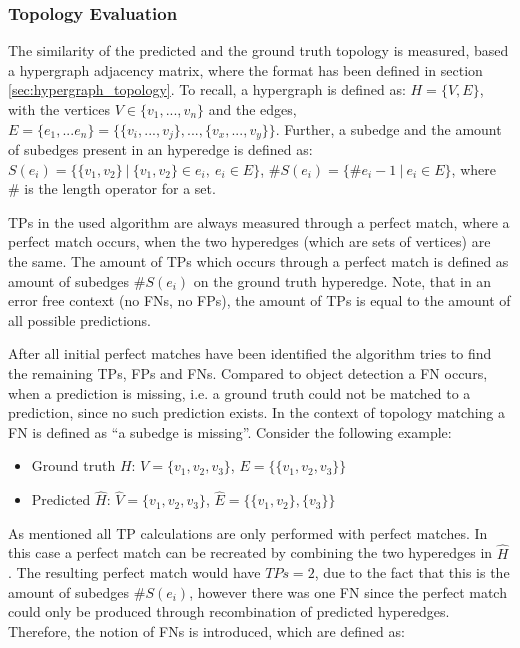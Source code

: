 \subsubsection{Topology Evaluation}

The similarity of the predicted and the ground truth topology is measured, based a hypergraph adjacency matrix, where the format has been defined in section \ref{sec:hypergraph_topology}.
To recall, a hypergraph is defined as: $H = \{V, E\}$, with the vertices $V \in \{v_1,...,v_n\}$ and the edges, $E = \{e_1,...e_n\} = \{\{v_i,...,v_j\},...,\{v_x,...,v_y\}\}$.
Further, a subedge and the amount of subedges present in an hyperedge is defined as: $S(e_i) = \{ \{v_1,v_2\}\ |\ \{v_1,v_2\} \in e_i,\ e_i \in E\}$, $\#S(e_i) = \{ \#e_i - 1\ |\  e_i \in E\}$, where \# is the length operator for a set.

\acp{TP} in the used algorithm are always measured through a perfect match, where a perfect match occurs, when the two hyperedges (which are sets of vertices) are the same.
The amount of \acp{TP} which occurs through a perfect match is defined as amount of subedges $\#S(e_i)$ on the ground truth hyperedge.
Note, that in an error free context (no \acp{FN}, no \acp{FP}), the amount of \acp{TP} is equal to the amount of all possible predictions.

After all initial perfect matches have been identified the algorithm tries to find the remaining \acp{TP}, \acp{FP} and \acp{FN}.
Compared to object detection a \ac{FN} occurs, when a prediction is missing, i.e. a ground truth could not be matched to a prediction, since no such prediction exists.
In the context of topology matching a \ac{FN} is defined as ``a subedge is missing''.
Consider the following example:

\begin{itemize}
    \item Ground truth $H$: $V = \{v_1, v_2, v_3\}$, $E = \{\{v_1, v_2, v_3\}\}$
    \item Predicted $\hat{H}$: $\hat{V} = \{v_1, v_2, v_3\}$, $\hat{E} = \{\{v_1, v_2\}, \{v_3\}\}$
\end{itemize}

As mentioned all \ac{TP} calculations are only performed with perfect matches.
In this case a perfect match can be recreated by combining the two hyperedges in $\hat{H}$.
The resulting perfect match would have $TPs = 2$, due to the fact that this is the amount of subedges $\#S(e_i)$, however there was one \ac{FN} since the perfect match could only be produced through recombination of predicted hyperedges.
Therefore, the notion of \acp{FN} is introduced, which are defined as:

